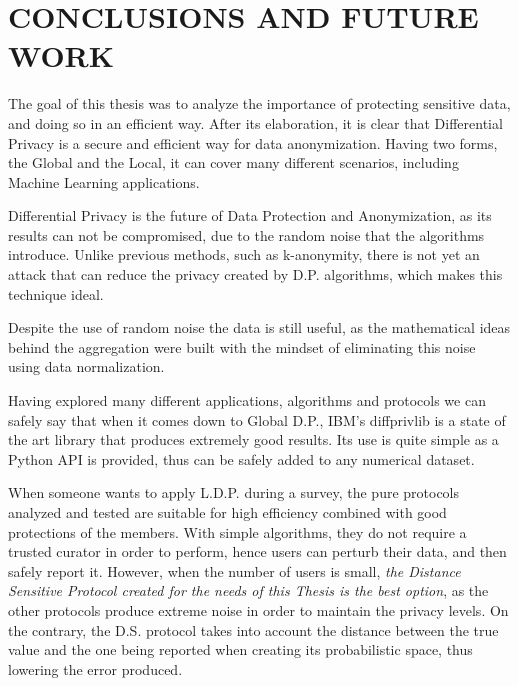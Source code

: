 \documentclass[inscr]{dithesis}
\begin{document}
\frontmatter

\mainmatter















\chapter{CONCLUSIONS AND FUTURE WORK}

The goal of this thesis was to analyze the importance of protecting sensitive data, and doing so in an efficient way. After its elaboration, it is clear that Differential Privacy is a secure and efficient way for data anonymization. Having two forms, the Global and the Local, it can cover many different scenarios, including Machine Learning applications.

Differential Privacy is the future of Data Protection and Anonymization, as its results can not be compromised, due to the random noise that the algorithms introduce. Unlike previous methods, such as k-anonymity, there is not yet an attack that can reduce the privacy created by D.P. algorithms, which makes this technique ideal.

Despite the use of random noise the data is still useful, as the mathematical ideas behind the aggregation were built with the mindset of eliminating this noise using data normalization.

Having explored many different applications, algorithms and protocols we can safely say that when it comes down to Global D.P., IBM's diffprivlib is a state of the art library that produces extremely good results. Its use is quite simple as a Python API is provided, thus can be safely added to any numerical dataset.

When someone wants to apply L.D.P. during a survey, the pure protocols analyzed and tested are suitable for high efficiency combined with good protections of the members. With simple algorithms, they do not require a trusted curator in order to perform, hence users can perturb their data, and then safely report it. However, when the number of users is small, \emph{the Distance Sensitive Protocol created for the needs of this Thesis is the best option}, as the other protocols produce extreme noise in order to maintain the privacy levels. On the contrary, the D.S. protocol takes into account the distance between the true value and the one being reported when creating its probabilistic space, thus lowering the error produced.
\end{document}
